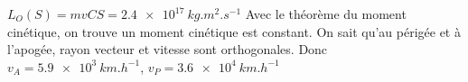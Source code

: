 \begin{solution}
\begin{questions}
    \questioncours 
    \question 
    \question $L_O(S)=mvCS=\SI{2.4e17}{kg.m^2.s^{-1}}$
    \question Avec le théorème du moment cinétique, on trouve un moment cinétique est constant. On sait qu'au périgée et à l'apogée, rayon vecteur et vitesse sont orthogonales. Donc $v_A=\SI{5.9e3}{km.h^{-1}}$, $v_P=\SI{3.6e4}{km.h^{-1}}$
\end{questions}

\end{solution}

